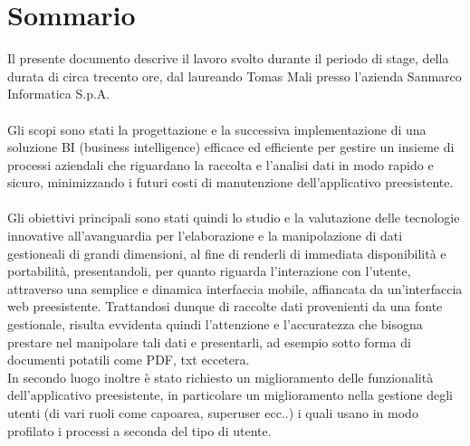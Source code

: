 
\cleardoublepage
{}
{}
\begingroup
\let\clearpage\relax
\let\cleardoublepage\relax
\let\cleardoublepage\relax

\chapter*{Sommario}

Il presente documento descrive il lavoro svolto durante il periodo di stage, della durata di circa trecento ore, dal laureando Tomas Mali presso l'azienda Sanmarco Informatica S.p.A.\\ \\

Gli scopi sono stati la progettazione e la successiva implementazione di una soluzione BI (business intelligence) efficace ed efficiente per gestire un insieme di processi aziendali che riguardano la raccolta e l'analisi dati in modo rapido e sicuro, minimizzando i futuri costi di manutenzione dell’applicativo preesistente.\\\\

Gli obiettivi principali sono stati quindi lo studio e la valutazione delle tecnologie innovative all'avanguardia per l'elaborazione e la manipolazione di dati gestioneali di grandi dimensioni, al fine di renderli di immediata disponibilità e portabilità, presentandoli, per quanto riguarda l'interazione con l'utente, attraverso una semplice e dinamica interfaccia mobile, affiancata da un'interfaccia web preesistente. Trattandosi dunque di raccolte dati provenienti da una fonte gestionale, risulta evvidenta quindi l'attenzione e l'accuratezza  che bisogna prestare nel manipolare tali dati e presentarli, ad esempio sotto forma di documenti potatili come PDF, txt eccetera.\\ 
In secondo luogo inoltre è stato richiesto un miglioramento delle funzionalità dell'applicativo preesistente, in particolare un miglioramento nella gestione degli utenti (di vari ruoli come capoarea, superuser ecc..) i quali usano in modo profilato i processi a seconda del tipo di utente.

%
%

\endgroup			

\vfill

